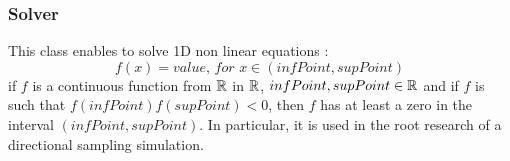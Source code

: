 \newpage
\subsubsection{Solver}

This class enables to solve 1D non linear equations :
\begin{equation*}
f(x) = value, \, for \, \, x \in (infPoint, supPoint)
\end{equation*}
if $f$ is a continuous function from ${\mathbb R}$ in ${\mathbb R}$, $infPoint, supPoint \in {\mathbb R}$ and if $f$ is such that $f(infPoint)f(supPoint) < 0$, then $f$ has at least a zero in the interval $(infPoint, supPoint)$. In particular, it is used in the root research of a directional sampling simulation.
